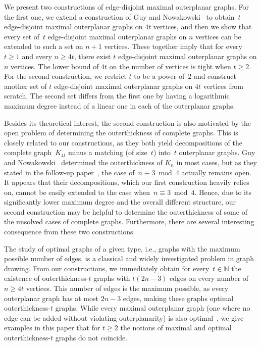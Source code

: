 \documentclass[unicode,runningheads,envcountsame,a4paper,dvipsnames,12pt]{llncs}
\newcommand{\N}{\mathbb{N}}
\begin{document}
	We present two constructions of edge-disjoint maximal outerplanar graphs.
	For the first one, we extend a construction of Guy and Nowakowski~\cite{Guy1990} to obtain~\(t\) edge-disjoint maximal outerplanar graphs on \(4t\) vertices, 
	and then we show that every set of~\(t\) edge-disjoint maximal outerplanar graphs on \(n\) vertices can be extended to such a set on \(n+1\) vertices.
	These together imply that for every~$t \ge 1$ and every $n \ge 4t$, there exist $t$ edge-disjoint maximal outerplanar graphs on $n$ vertices.
	The lower bound of \(4t\) on the number of vertices is tight when $t \ge 2$.
	For the second construction, we restrict $t$ to be a power of~$2$ 
	and construct another set of \(t\) edge-disjoint maximal outerplanar graphs on \(4t\) vertices from scratch.
	The second set differs from the first one by having a logarithmic maximum degree instead of a linear one in each of the outerplanar graphs.
	
	Besides its theoretical interest, the second construction is also motivated by the open problem of determining the outerthickness of complete graphs.
	This is closely related to our constructions, as they both yield decompositions of the complete graph~\(K_{4t}\) minus a matching (of size~\(t\)) into~\(t\) outerplanar graphs.
	Guy and Nowakowski~\cite{Guy1990} determined the outerthickness of $K_{n}$ in most cases,
	but as they stated in the follow-up paper~\cite{GuyNowakowski1990b}, the case of~\(n \equiv 3 \bmod 4\) actually remains open.
	It appears that their decompositions, which our first construction heavily relies on, cannot be easily extended to the case when~${n \equiv 3 \bmod 4}$.
	Hence, due to its significantly lower maximum degree and the overall different structure, our second construction may be helpful to determine the outerthickness of some of the unsolved cases of complete graphs. Furthermore, there are several interesting consequence from these two constructions.
	
	The study of optimal graphs of a given type, i.e., graphs with the maximum possible number of edges, is a classical and widely investigated problem in graph drawing. From our constructions, we immediately obtain for every~\(t \in \N\) the existence of outerthick\-ness-\(t\) graphs with \(t(2n-3)\) edges on every number of~\(n \geq 4t\) vertices. This number of edges is the maximum possible, as every outerplanar graph has at most \(2n-3\) edges, making these graphs optimal outerthickness-\(t\) graphs. While every maximal outerplanar graph (one where no edge can be added without violating outerplanarity) is also optimal~\cite[Corollary~11.9(a)]{Harary1969book}, we give examples in this paper that for \(t\geq2\) the notions of maximal and optimal outerthickness-\(t\) graphs do not coincide.
	
\end{document}
